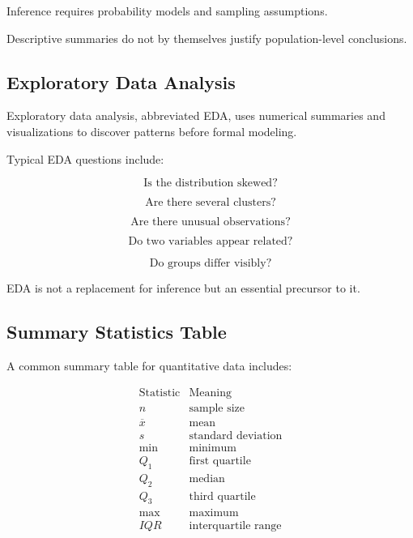 Inference requires probability models and sampling assumptions.

Descriptive summaries do not by themselves justify population-level
conclusions.

\subsection{Exploratory Data Analysis}
\label{subsec:exploratory-data-analysis}

Exploratory data analysis, abbreviated EDA, uses numerical summaries and
visualizations to discover patterns before formal modeling.

Typical EDA questions include:

\[
\text{Is the distribution skewed?}
\]

\[
\text{Are there several clusters?}
\]

\[
\text{Are there unusual observations?}
\]

\[
\text{Do two variables appear related?}
\]

\[
\text{Do groups differ visibly?}
\]

EDA is not a replacement for inference but an essential precursor to it.

\subsection{Summary Statistics Table}
\label{subsec:summary-statistics-table}

A common summary table for quantitative data includes:

\[
\begin{array}{c|c}
\text{Statistic} & \text{Meaning}\\
\hline
n & \text{sample size}\\
\overline{x} & \text{mean}\\
s & \text{standard deviation}\\
\min & \text{minimum}\\
Q_1 & \text{first quartile}\\
Q_2 & \text{median}\\
Q_3 & \text{third quartile}\\
\max & \text{maximum}\\
IQR & \text{interquartile range}
\end{array}
\]

